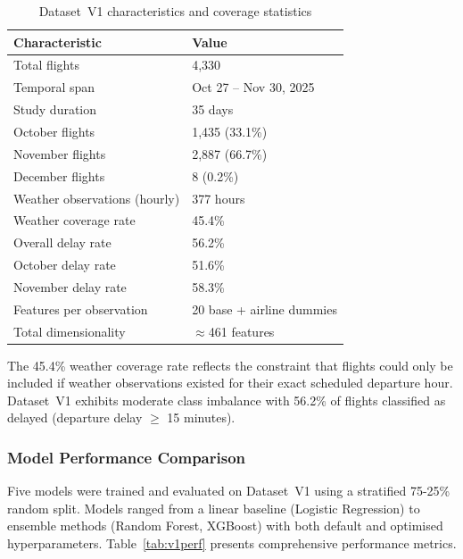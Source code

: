 \documentclass{report}
\begin{document}
\begin{table}[H]
\centering
\caption{Dataset~V1 characteristics and coverage statistics}
\label{tab:v1char}
\begin{tabular}{ll}
\toprule
\textbf{Characteristic} & \textbf{Value} \\
\midrule
Total flights                  & 4,330 \\
Temporal span                  & Oct 27 -- Nov 30, 2025 \\
Study duration                 & 35 days \\
October flights                & 1,435 (33.1\%) \\
November flights               & 2,887 (66.7\%) \\
December flights               & 8 (0.2\%) \\
Weather observations (hourly)  & 377 hours \\
Weather coverage rate          & 45.4\% \\
Overall delay rate             & 56.2\% \\
October delay rate             & 51.6\% \\
November delay rate            & 58.3\% \\
Features per observation       & 20 base + airline dummies \\
Total dimensionality           & $\approx$461 features \\
\bottomrule
\end{tabular}
\end{table}

The 45.4\% weather coverage rate reflects the constraint that flights could
only be included if weather observations existed for their exact scheduled
departure hour.  Dataset~V1 exhibits moderate class imbalance with 56.2\% of
flights classified as delayed (departure delay $\geq$ 15 minutes).

\subsubsection*{Model Performance Comparison}

Five models were trained and evaluated on Dataset~V1 using a stratified
75-25\% random split.  Models ranged from a linear baseline (Logistic
Regression) to ensemble methods (Random Forest, XGBoost) with both default
and optimised hyperparameters.  Table~\ref{tab:v1perf} presents comprehensive
performance metrics.
\end{document}

